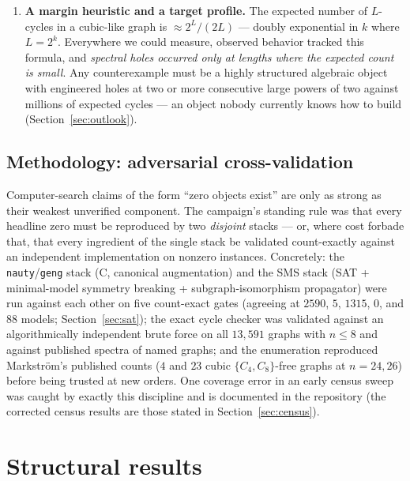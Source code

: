 \documentclass[11pt]{article}
\theoremstyle{remark}
\newcommand{\Cyc}[1]{C_{#1}}
\begin{document}
\begin{enumerate}
family of algebraic constructions (voltage lifts certified through twisted
spectra).
\item \textbf{A margin heuristic and a target profile.} The expected number
of $L$-cycles in a cubic-like graph is $\approx 2^L/(2L)$ --- doubly
exponential in $k$ where $L = 2^k$. Everywhere we could measure, observed
behavior tracked this formula, and \emph{spectral holes occurred only at
lengths where the expected count is small}. Any counterexample must be a
highly structured algebraic object with engineered holes at two or more
consecutive large powers of two against millions of expected cycles ---
an object nobody currently knows how to build (Section~\ref{sec:outlook}).
\end{enumerate}

\subsection{Methodology: adversarial cross-validation}
\label{sec:method}

Computer-search claims of the form ``zero objects exist'' are only as strong
as their weakest unverified component. The campaign's standing rule was that
every headline zero must be reproduced by two \emph{disjoint} stacks --- or,
where cost forbade that, that every ingredient of the single stack be
validated count-exactly against an independent implementation on nonzero
instances. Concretely: the \texttt{nauty}/\texttt{geng} stack (C, canonical
augmentation) and the SMS stack (SAT + minimal-model symmetry breaking +
subgraph-isomorphism propagator) were run against each other on five
count-exact gates (agreeing at $2590$, $5$, $1315$, $0$, and $88$ models;
Section~\ref{sec:sat}); the exact cycle checker was validated against an
algorithmically independent brute force on all $13{,}591$ graphs with
$n \le 8$ and against published spectra of named graphs; and the enumeration
reproduced Markstr\"om's published counts ($4$ and $23$ cubic
$\{\Cyc4,\Cyc8\}$-free graphs at $n = 24, 26$) before being trusted at new
orders. One coverage error in an early census sweep was caught by exactly
this discipline and is documented in the repository (the corrected census
results are those stated in Section~\ref{sec:census}).

\section{Structural results}
\label{sec:structural}
\end{document}
